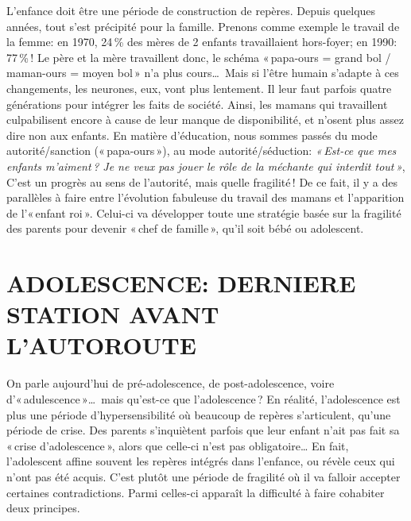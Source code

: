 \documentclass[11pt]{article} %
\begin{document}
  L'enfance doit être une période de construction de repères.\newline
  Depuis quelques années, tout s'est précipité pour la famille. Prenons comme exemple le travail de la femme: en 1970, 24\,\% des mères de 2 enfants travaillaient hors-foyer; en 1990: 77\,\% !\newline
  Le père et la mère travaillent donc, le schéma « papa-ours = grand bol / maman-ours = moyen bol » n'a plus cours\dots\ Mais si l'être humain s'adapte à ces changements, les neurones, eux, vont plus lentement. Il leur faut parfois quatre générations pour intégrer les faits de société. Ainsi, les mamans qui travaillent culpabilisent encore à cause de leur manque de disponibilité, et n'osent plus assez dire non aux enfants.\newline
  En matière d'éducation, nous sommes passés du mode autorité/sanction (« papa-ours »), au mode autorité/séduction: \textit{« Est-ce que mes enfants m'aiment ? Je ne veux pas jouer le rôle de la méchante qui interdit tout »}, C'est un progrès au sens de l'autorité, mais quelle fragilité ! De ce fait, il y a des parallèles à faire entre l'évolution fabuleuse du travail des mamans et l'apparition de l'« enfant roi ». Celui-ci va développer toute une stratégie basée sur la fragilité des parents pour devenir « chef de famille », qu'il soit bébé ou adolescent.


\section{ADOLESCENCE: DERNIERE STATION AVANT L'AUTOROUTE}

  On parle aujourd'hui de pré-adolescence, de post-adolescence, voire d'« adulescence »\dots\ mais qu'est-ce que l'adolescence ?\newline
  En réalité, l'adolescence est plus une période d'hypersensibilité où beaucoup de repères s'articulent, qu'une période de crise. Des parents s'inquiètent parfois que leur enfant n'ait pas fait sa « crise d'adolescence », alors que celle-ci n'est pas obligatoire\dots\newline
  En fait, l'adolescent affine souvent les repères intégrés dans l'enfance, ou révèle ceux qui n'ont pas été acquis. C'est plutôt une période de fragilité où il va falloir accepter certaines contradictions.\newline
  Parmi celles-ci apparaît la difficulté à faire cohabiter deux principes.
\end{document}
